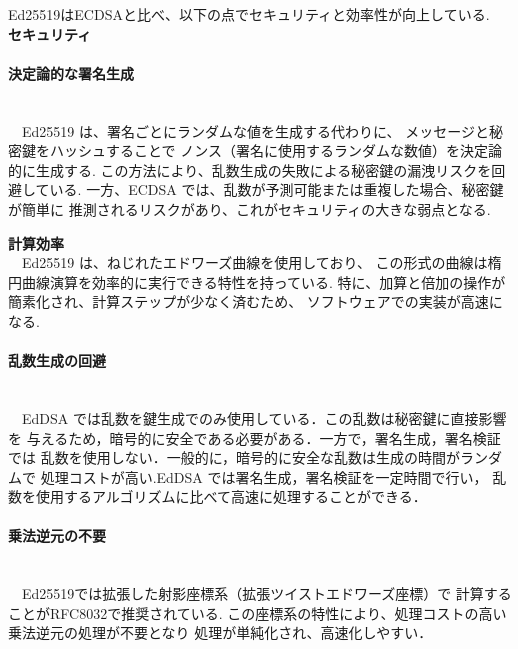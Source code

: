 Ed25519はECDSAと比べ、以下の点でセキュリティと効率性が向上している.\\[1em]
{\large\textbf{セキュリティ}}\\
\paragraph{決定論的な署名生成} \leavevmode\\
　Ed25519 は、署名ごとにランダムな値を生成する代わりに、
メッセージと秘密鍵をハッシュすることで 
ノンス（署名に使用するランダムな数値）を決定論的に生成する.
この方法により、乱数生成の失敗による秘密鍵の漏洩リスクを回避している.
一方、ECDSA では、乱数が予測可能または重複した場合、秘密鍵が簡単に
推測されるリスクがあり、これがセキュリティの大きな弱点となる.
\par
\vspace{1em}
{\large\textbf{計算効率}}\\[1em]
　Ed25519 は、ねじれたエドワーズ曲線を使用しており、
この形式の曲線は楕円曲線演算を効率的に実行できる特性を持っている.
特に、加算と倍加の操作が簡素化され、計算ステップが少なく済むため、
ソフトウェアでの実装が高速になる.\\

\paragraph{乱数生成の回避} \leavevmode\\
　EdDSA では乱数を鍵生成でのみ使用している．この乱数は秘密鍵に直接影響を
与えるため，暗号的に安全である必要がある．一方で，署名生成，署名検証では
乱数を使用しない．一般的に，暗号的に安全な乱数は生成の時間がランダムで
処理コストが高い.EdDSA では署名生成，署名検証を一定時間で行い，
乱数を使用するアルゴリズムに比べて高速に処理することができる．\\

\paragraph{乗法逆元の不要} \leavevmode\\
　Ed25519では拡張した射影座標系（拡張ツイストエドワーズ座標）で
計算することがRFC8032で推奨されている.
この座標系の特性により、処理コストの高い乗法逆元の処理が不要となり
処理が単純化され、高速化しやすい．

